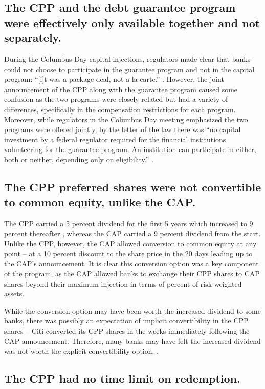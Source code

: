 \documentclass[12pt]{article}
\begin{document}
\subsection{The CPP and the debt guarantee program were effectively only available together and not separately.}

During the Columbus Day capital injections, regulators made clear that banks could not choose to participate in the guarantee program and not in the capital program: ``[i]t was a package deal, not a la carte.'' \citep{Geithner}. However, the joint announcement of the CPP along with the guarantee program caused some confusion as the two programs were closely related but had a variety of differences, specifically in the compensation restrictions for each program. Moreover, while regulators in the Columbus Day meeting emphasized the two programs were offered jointly, by the letter of the law there was ``no capital investment by a federal regulator required for the financial institutions volunteering for the guarantee program. An institution can participate in either, both or neither, depending only on eligibility.'' \citep{mofoCap}.

\subsection{The CPP preferred shares were not convertible to common equity, unlike the CAP.}

The CPP carried a 5 percent dividend for the first 5 years which increased to 9 percent thereafter , whereas the CAP carried a 9 percent dividend from the start. Unlike the CPP, however, the CAP allowed conversion to common equity at any point -- at a 10 percent discount to the share price in the 20 days leading up to the CAP's announcement. It is clear this conversion option was a key component of the program, as the CAP allowed banks to exchange their CPP shares to CAP shares beyond their maximum injection in terms of percent of risk-weighted assets.

While the conversion option may have been worth the increased dividend to some banks, there was possibly an expectation of implicit convertibility in the CPP shares -- Citi converted its CPP shares in the weeks immediately following the CAP announcement. Therefore, many banks may have felt the increased dividend was not worth the explicit convertibility option. \citep{GW}.

\subsection{The CPP had no time limit on redemption.}
\end{document}
